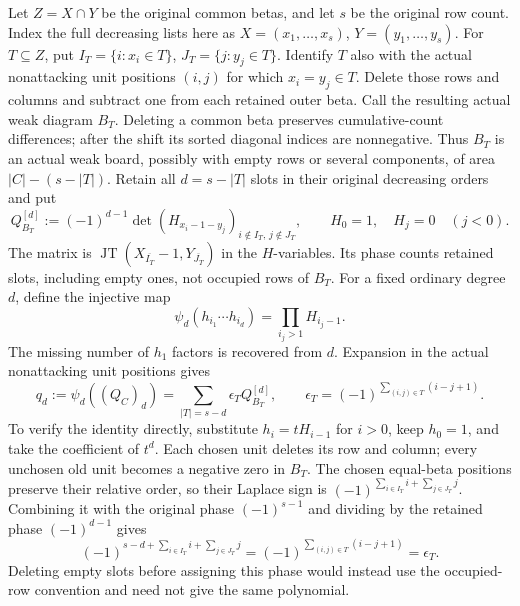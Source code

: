 \documentclass[11pt,a4paper]{amsart}
\numberwithin{equation}{section}
\theoremstyle{plain}
\theoremstyle{definition}
\newcommand{\JT}{\operatorname{JT}}
\begin{document}
Let \(Z=X\cap Y\) be the original common betas, and let \(s\) be the original
row count.  Index the full decreasing lists here as
\(X=(x_1,\ldots,x_s)\), \(Y=(y_1,\ldots,y_s)\).  For \(T\subseteq Z\), put
\(I_T=\{i:x_i\in T\}\), \(J_T=\{j:y_j\in T\}\).  Identify \(T\) also with
the actual nonattacking unit positions \((i,j)\) for which \(x_i=y_j\in T\).
Delete those rows and columns and subtract one from each retained outer
beta.  Call the resulting actual weak diagram \(B_T\).  Deleting a common
beta preserves cumulative-count differences; after the shift its sorted
diagonal indices are nonnegative.  Thus \(B_T\) is an actual weak board,
possibly with empty rows or several components, of area \(|C|-(s-|T|)\).
Retain all \(d=s-|T|\) slots in their original decreasing orders and put
\[
 Q_{B_T}^{[d]}:=(-1)^{d-1}
       \det(H_{x_i-1-y_j})_{i\notin I_T,\,j\notin J_T},
 \qquad H_0=1,\quad H_j=0\quad(j<0).
\]
The matrix is \(\JT(X_{\overline{I_T}}-1,Y_{\overline{J_T}})\) in the
\(H\)-variables.  Its phase counts retained slots, including empty ones,
not occupied rows of \(B_T\).
For a fixed ordinary degree \(d\), define the injective map
\[
 \psi_d(h_{i_1}\cdots h_{i_d})=\prod_{i_j>1}H_{i_j-1}.
\]
The missing number of \(h_1\) factors is recovered from \(d\).
Expansion in the actual nonattacking unit positions gives
\begin{equation}\label{eq:all-unit-contraction}
 q_d:=\psi_d((Q_C)_d)
   =\sum_{|T|=s-d}\epsilon_T Q_{B_T}^{[d]},\qquad
 \epsilon_T=(-1)^{\sum_{(i,j)\in T}(i-j+1)}.
\end{equation}
To verify the identity directly, substitute \(h_i=tH_{i-1}\) for \(i>0\),
keep \(h_0=1\), and take the coefficient of \(t^d\).  Each chosen unit deletes
its row and column; every unchosen old unit becomes a negative zero in
\(B_T\).  The chosen equal-beta positions preserve their relative order,
so their Laplace sign is \((-1)^{\sum_{i\in I_T}i+\sum_{j\in J_T}j}\).
Combining it with the original phase \((-1)^{s-1}\) and dividing by the
retained phase \((-1)^{d-1}\) gives
\[
 (-1)^{s-d+\sum_{i\in I_T}i+\sum_{j\in J_T}j}
 =(-1)^{\sum_{(i,j)\in T}(i-j+1)}=\epsilon_T.
\]
Deleting empty slots before assigning this phase would instead use the
occupied-row convention and need not give the same polynomial.
\end{document}
